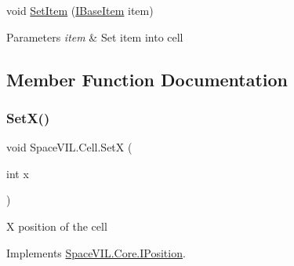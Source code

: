 \begin{DoxyCompactItemize}
\begin{DoxyCompactList}
\end{DoxyCompactList}\item 
\mbox{\label{class_space_v_i_l_1_1_cell_a43598f1cee7871119f502dc95bc2b652}} 
void \mbox{\hyperlink{class_space_v_i_l_1_1_cell_a43598f1cee7871119f502dc95bc2b652}{Set\+Item}} (\mbox{\hyperlink{interface_space_v_i_l_1_1_core_1_1_i_base_item}{I\+Base\+Item}} item)
\begin{DoxyCompactList}\small\item\em 
\begin{DoxyParams}{Parameters}
{\em item} & Set item into cell \\
\hline
\end{DoxyParams}
\end{DoxyCompactList}\end{DoxyCompactItemize}


\subsection{Member Function Documentation}
\mbox{\label{class_space_v_i_l_1_1_cell_aa6cdc40507c12d0e0bb40e7daa59ab83}} 
\subsubsection{\texorpdfstring{Set\+X()}{SetX()}}
{\footnotesize\ttfamily void Space\+V\+I\+L.\+Cell.\+SetX (\begin{DoxyParamCaption}\item[{int}]{x }\end{DoxyParamCaption})\hspace{0.3cm}{\ttfamily [inline]}}



X position of the cell 



Implements \mbox{\hyperlink{interface_space_v_i_l_1_1_core_1_1_i_position}{Space\+V\+I\+L.\+Core.\+I\+Position}}.

\mbox{\label{class_space_v_i_l_1_1_cell_a1876cc8c7d5b4ad383df1fe2330366f8}} 
